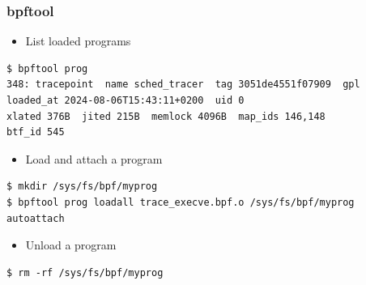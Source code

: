 \begin{frame}[fragile]
  \frametitle{bpftool}
  \begin{itemize}
    \item List loaded programs
  \end{itemize}
  \begin{block}{}
    \fontsize{10}{10}\selectfont
    \begin{verbatim}
$ bpftool prog
348: tracepoint  name sched_tracer  tag 3051de4551f07909  gpl
loaded_at 2024-08-06T15:43:11+0200  uid 0
xlated 376B  jited 215B  memlock 4096B  map_ids 146,148
btf_id 545
    \end{verbatim}
  \end{block}
  \begin{itemize}
    \item Load and attach a program
  \end{itemize}
  \begin{block}{}
    \fontsize{10}{10}\selectfont
    \begin{verbatim}
$ mkdir /sys/fs/bpf/myprog
$ bpftool prog loadall trace_execve.bpf.o /sys/fs/bpf/myprog autoattach
    \end{verbatim}
  \end{block}
  \begin{itemize}
    \item Unload a program
  \end{itemize}
  \begin{block}{}
    \fontsize{10}{10}\selectfont
    \begin{verbatim}
$ rm -rf /sys/fs/bpf/myprog
    \end{verbatim}
  \end{block}
\end{frame}

